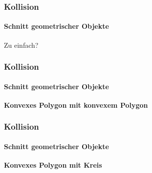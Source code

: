 \documentclass[dvips,12pt,xcolor=table]{beamer}
\begin{document}
\begin{frame}
\frametitle{Kollision}
\framesubtitle{Schnitt geometrischer Objekte}
\begin{center}
{\LARGE Zu einfach?} \\
\vspace{0.4cm}
\end{center}
\end{frame}

\begin{frame}
\frametitle{Kollision}
\framesubtitle{Schnitt geometrischer Objekte}
\textbf{Konvexes Polygon mit konvexem Polygon}

\end{frame}

\begin{frame}
\frametitle{Kollision}
\framesubtitle{Schnitt geometrischer Objekte}
\textbf{Konvexes Polygon mit Kreis}

\end{frame}
\end{document}
